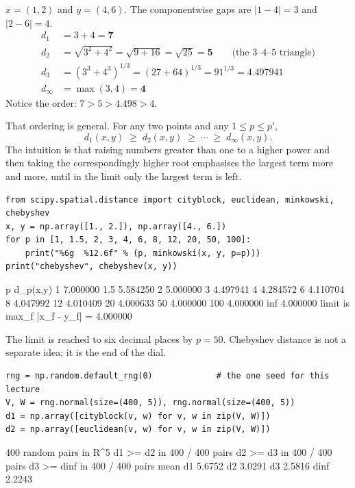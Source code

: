 \documentclass[11pt]{article}
\begin{document}
\begin{worked}
$x = (1,2)$ and $y = (4,6)$. The componentwise gaps are $|1-4| = 3$ and
$|2-6| = 4$.
\begin{align*}
  d_1 &= 3 + 4 = \mathbf{7} \\
  d_2 &= \sqrt{3^2 + 4^2} = \sqrt{9 + 16} = \sqrt{25} = \mathbf{5}
    \qquad \text{(the 3--4--5 triangle)} \\
  d_3 &= \left(3^3 + 4^3\right)^{1/3} = (27 + 64)^{1/3} = 91^{1/3}
    = \mathbf{4.497941} \\
  d_\infty &= \max(3, 4) = \mathbf{4}
\end{align*}
Notice the order: $7 > 5 > 4.498 > 4$.
\end{worked}

That ordering is general. For any two points and any $1 \le p \le p'$,
\begin{equation}
  d_1(x,y) \;\ge\; d_2(x,y) \;\ge\; \cdots \;\ge\; d_\infty(x,y).
  \label{eq:order}
\end{equation}
The intuition is that raising numbers greater than one to a higher power and
then taking the correspondingly higher root emphasises the largest term more
and more, until in the limit only the largest term is left.

\begin{lstlisting}
from scipy.spatial.distance import cityblock, euclidean, minkowski, chebyshev
x, y = np.array([1., 2.]), np.array([4., 6.])
for p in [1, 1.5, 2, 3, 4, 6, 8, 12, 20, 50, 100]:
    print("%6g  %12.6f" % (p, minkowski(x, y, p=p)))
print("chebyshev", chebyshev(x, y))
\end{lstlisting}
\begin{codeout}
     p      d_p(x,y)
     1      7.000000
   1.5      5.584250
     2      5.000000
     3      4.497941
     4      4.284572
     6      4.110704
     8      4.047992
    12      4.010409
    20      4.000633
    50      4.000000
   100      4.000000
   inf      4.000000
limit is max_f |x_f - y_f| = 4.000000
\end{codeout}

The limit is reached to six decimal places by $p = 50$. Chebyshev distance is
not a separate idea; it is the end of the dial.

\begin{lstlisting}
rng = np.random.default_rng(0)             # the one seed for this lecture
V, W = rng.normal(size=(400, 5)), rng.normal(size=(400, 5))
d1 = np.array([cityblock(v, w) for v, w in zip(V, W)])
d2 = np.array([euclidean(v, w) for v, w in zip(V, W)])
\end{lstlisting}
\begin{codeout}
400 random pairs in R^5
d1 >= d2 in 400 / 400 pairs
d2 >= d3 in 400 / 400 pairs
d3 >= dinf in 400 / 400 pairs
mean  d1 5.6752   d2 3.0291   d3 2.5816   dinf 2.2243
\end{codeout}
\end{document}
